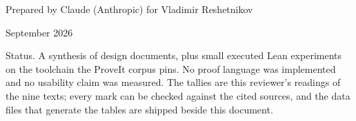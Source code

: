 \documentclass[11pt,a4paper]{article}
\theoremstyle{definition}
\begin{document}
\begin{titlepage}
\begin{keybox}
\end{keybox}
\vfill
{\sffamily Prepared by Claude (Anthropic) for Vladimir Reshetnikov\par}
{ September 2026\par}
\vspace{3mm}
{\small\color{muted}Status. A synthesis of design documents, plus small executed Lean experiments on the toolchain the ProveIt corpus pins. No proof language was implemented and no usability claim was measured. The tallies are this reviewer's readings of the nine texts; every mark can be checked against the cited sources, and the data files that generate the tables are shipped beside this document.\par}
\end{titlepage}

\begin{abstract}

\end{abstract}
\end{document}
